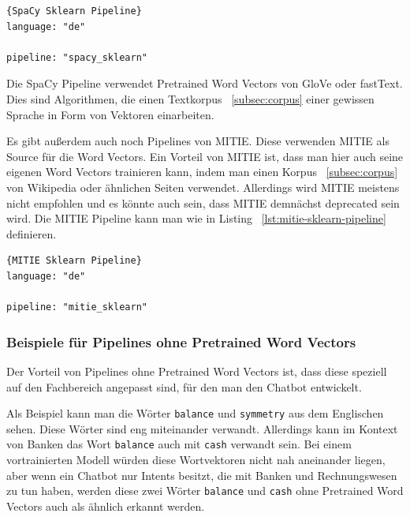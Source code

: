 \begin{lstlisting}[label={lst:spacy-sklearn-pipeline},caption={SpaCy Sklearn Pipeline}]{SpaCy Sklearn Pipeline}
language: "de"

pipeline: "spacy_sklearn"
\end{lstlisting}

Die SpaCy Pipeline verwendet Pretrained Word Vectors von GloVe oder fastText.
Dies sind Algorithmen, die einen Textkorpus ~\ref{subsec:corpus} einer gewissen Sprache in Form von Vektoren einarbeiten.\cite{spacySklearnPipeline, spacyNLP, rasaMasterclassPreConfiguredPipelines}

Es gibt außerdem auch noch Pipelines von MITIE.
Diese verwenden MITIE als Source für die Word Vectors.
Ein Vorteil von MITIE ist, dass man hier auch seine eigenen Word Vectors trainieren kann, indem man einen Korpus ~\ref{subsec:corpus} von Wikipedia oder ähnlichen Seiten verwendet.
Allerdings wird MITIE meistens nicht empfohlen und es könnte auch sein, dass MITIE demnächst deprecated sein wird.
Die MITIE Pipeline kann man wie in Listing ~\ref{lst:mitie-sklearn-pipeline} definieren.\cite{mitieNLP, mitieDeprecated}

\begin{lstlisting}[label={lst:mitie-sklearn-pipeline},caption={MITIE Sklearn Pipeline}]{MITIE Sklearn Pipeline}
language: "de"

pipeline: "mitie_sklearn"
\end{lstlisting}

\subsubsection{Beispiele für Pipelines ohne Pretrained Word Vectors}\label{subsubsec:pipeline-without-pretrained-word-vectors}

Der Vorteil von Pipelines ohne Pretrained Word Vectors ist, dass diese speziell auf den Fachbereich angepasst sind, für den man den Chatbot entwickelt.\cite{pretrainedVsSupervised, tensorFlowEmbedding}

Als Beispiel kann man die Wörter \texttt{balance} und \texttt{symmetry} aus dem Englischen sehen.
Diese Wörter sind eng miteinander verwandt.
Allerdings kann im Kontext von Banken das Wort \texttt{balance} auch mit \texttt{cash} verwandt sein.
Bei einem vortrainierten Modell würden diese Wortvektoren nicht nah aneinander liegen, aber wenn ein Chatbot nur Intents besitzt, die mit Banken und Rechnungswesen zu tun haben, werden diese zwei Wörter \texttt{balance} und \texttt{cash} ohne Pretrained Word Vectors auch als ähnlich erkannt werden.\cite{tensorFlowEmbedding}

